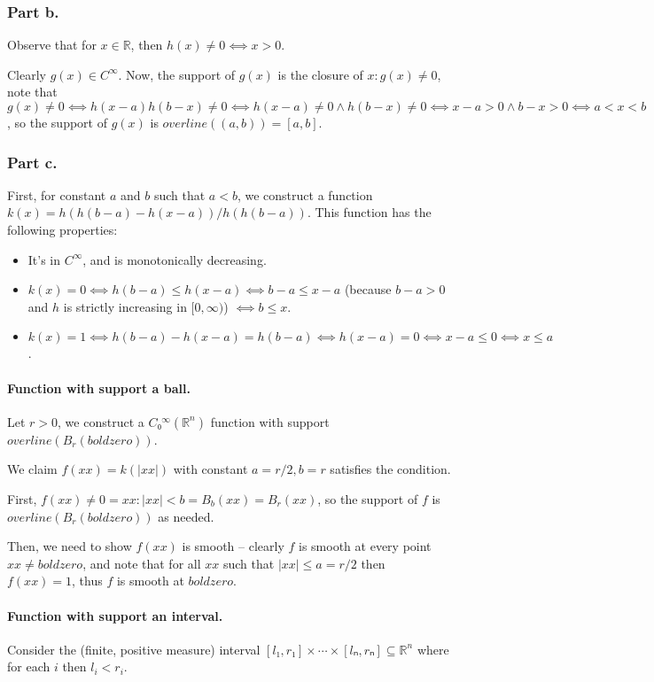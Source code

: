 \documentclass{article}
\begin{document}
\subsubsection{Part b.}
Observe that for $x ∈ ℝ$, then $h(x) ≠ 0 ⟺ x>0$.

Clearly $g(x)∈ C^∞$. Now, the support of $g(x)$ is the closure of ${x: g(x) ≠ 0}$, note that $g(x) ≠ 0 ⟺ h(x-a) h(b-x) ≠ 0 ⟺ h(x-a) ≠ 0 ∧ h(b-x) ≠ 0 ⟺ x-a>0 ∧ b-x>0 ⟺ a<x<b$, so the support of $g(x)$ is $overline((a, b))=[a, b]$.
\subsubsection{Part c.}

First, for constant $a$ and $b$ such that $a<b$, we construct a function $k(x)=h(h(b-a)-h(x-a))/h(h(b-a))$. This function has the following properties:
\begin{itemize}
    \item It's in $C^∞$, and is monotonically decreasing.
    \item $k(x)=0 ⟺ h(b-a) ≤ h(x-a) ⟺ b-a ≤ x-a$ (because $b-a>0$ and $h$ is strictly increasing in $[0, ∞)$) $⟺ b≤x$.
    \item $k(x)=1 ⟺ h(b-a)-h(x-a)=h(b-a) ⟺ h(x-a)=0 ⟺ x-a ≤ 0 ⟺ x ≤ a$.
\end{itemize}

\paragraph{Function with support a ball.} Let $r>0$, we construct a $C₀^∞(ℝ^n)$ function with support $overline(B_r (boldzero))$.

We claim $f(xx)=k(|xx|)$ with constant $a=r/2, b=r$ satisfies the condition.

First, ${f(xx)≠ 0}={xx: |xx|<b}=B_b (xx)=B_r (xx)$, so the support of $f$ is $overline(B_r (boldzero))$ as needed.

Then, we need to show $f(xx)$ is smooth -- clearly $f$ is smooth at every point $xx ≠ boldzero$, and note that for all $xx$ such that $|xx|≤ a=r/2$ then $f(xx)=1$, thus $f$ is smooth at $boldzero$.

\paragraph{Function with support an interval.} Consider the (finite, positive measure) interval $[l₁, r₁] × ⋯ ×[lₙ, rₙ] ⊆ ℝ^n$ where for each $i$ then $l_i<r_i$.
\end{document}
